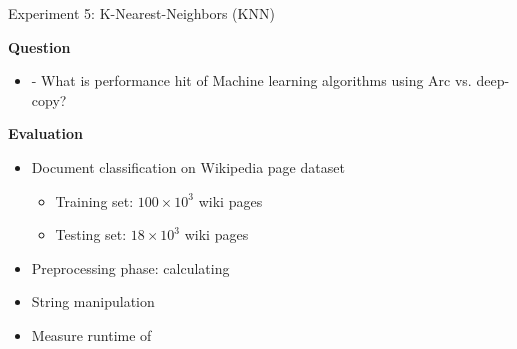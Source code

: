 \documentclass[9pt]{beamer}
\begin{document}
\begin{frame}[fragile]{Experiment 5: K-Nearest-Neighbors (KNN)}

    \textbf{Question}
    \begin{itemize}
        \item - What is performance hit of Machine learning algorithms using Arc vs. deep-copy?
    \end{itemize}

    \vspace{0.5cm}

    \textbf{Evaluation}
    \begin{itemize}
        \item Document classification on Wikipedia page dataset
        \begin{itemize}
            \item Training set: \(100 \times 10^3 \) wiki pages
            \item Testing set: \(18 \times  10^3\) wiki pages
        \end{itemize}
        \item Preprocessing phase: calculating 
        \item String manipulation
        \item Measure runtime of 
    \end{itemize}
\end{frame}

\end{document}
